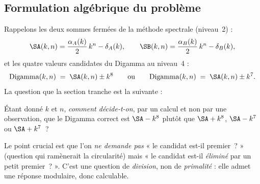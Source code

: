 \subsection{Formulation algébrique du problème}

Rappelons les deux sommes fermées de la méthode spectrale (niveau~2) :
\[
  \SA(k,n) = \frac{\alpha_A(k)}{2}\,k^{n} - \delta_A(k),
  \qquad
  \SB(k,n) = \frac{\alpha_B(k)}{2}\,k^{n} - \delta_B(k),
\]
et les quatre valeurs candidates du Digamma au niveau~4 :
\[
  \mathrm{Digamma}(k,n) \;=\; \SA(k,n) \pm k^{8}
  \qquad\text{ou}\qquad
  \mathrm{Digamma}(k,n) \;=\; \SA(k,n) \pm k^{7}.
\]
La question que la section tranche est la suivante :

\begin{boiteformule}
Étant donné $k$ et $n$, \emph{comment décide-t-on}, par un calcul et non
par une observation, que le Digamma correct est $\SA - k^{8}$ plutôt que
$\SA + k^{8}$, $\SA - k^{7}$ ou $\SA + k^{7}$~?
\end{boiteformule}

Le point crucial est que l'on \emph{ne demande pas} « le candidat est-il
premier~? » (question qui ramènerait la circularité) mais « le candidat
est-il \emph{éliminé} par un petit premier~? ». C'est une question de
\emph{division}, non de \emph{primalité} : elle admet une réponse
modulaire, donc calculable.
